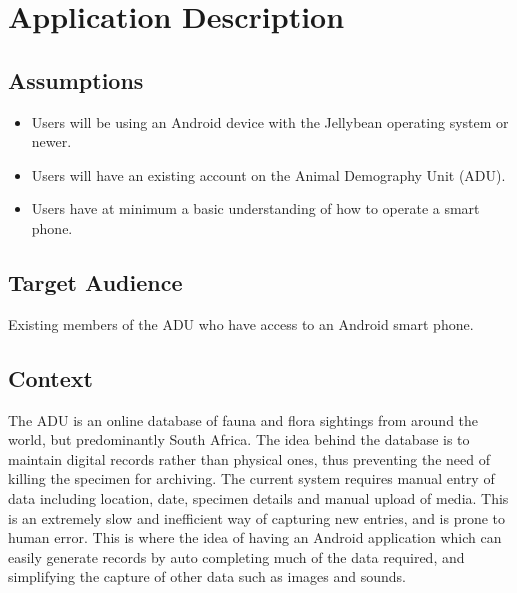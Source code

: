 \documentclass[
10pt, %
a4paper, %
oneside, %
headinclude,footinclude, %
BCOR5mm, %
]{scrartcl}
\begin{document}
\section{Application Description} %
\label{sec:application_description}
\subsection{Assumptions}
\label{sub:assumptions}

\begin{itemize}
\item Users will be using an Android device with the Jellybean operating system or newer.
\item Users will have an existing account on the Animal Demography Unit (ADU).
\item Users have at minimum a basic understanding of how to operate a smart phone.
\end{itemize}

\subsection{Target Audience}
\label{sub:target_audience}
Existing members of the ADU who have access to an Android smart phone.

\subsection{Context}
\label{sub:context}
The ADU is an online database of fauna and flora sightings from around the world, but predominantly South Africa. The idea behind the database is to maintain digital records rather than physical ones, thus preventing the need of killing the specimen for archiving. The current system requires manual entry of data including location, date, specimen details and manual upload of media. This is an extremely slow and inefficient way of capturing new entries, and is prone to human error. This is where the idea of having an Android application which can easily generate records by auto completing much of the data required, and simplifying the capture of other data such as images and sounds. 
\end{document}
